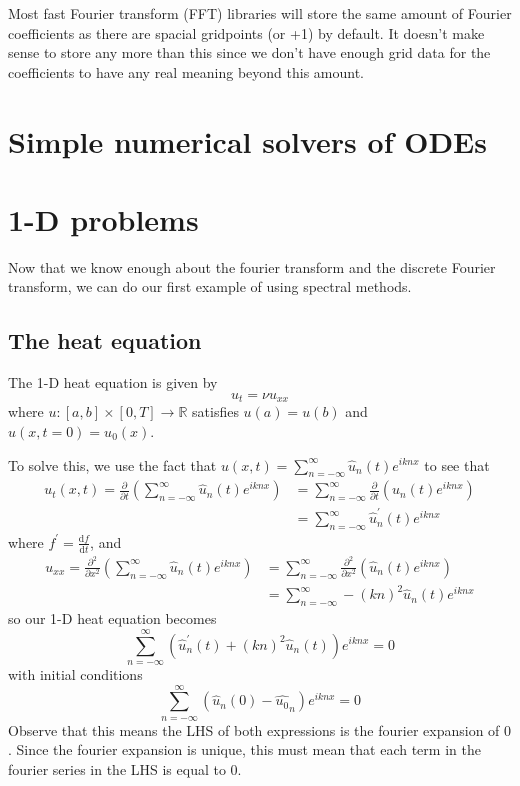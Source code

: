 \documentclass[a4paper,11pt]{article}
\theoremstyle{plain} %
\theoremstyle{remark}
\theoremstyle{definition} %
\renewcommand{\d}{\text{d}}
\newcommand{\R}{\mathbb{R}}
\begin{document}
Most fast Fourier transform (FFT) libraries will store the same amount of Fourier coefficients as there are spacial gridpoints (or +1) by default. It doesn't make sense to store any more than this since we don't have enough grid data for the coefficients to have any real meaning beyond this amount.

\section{Simple numerical solvers of ODEs}


\section{1-D problems}
Now that we know enough about the fourier transform and the discrete Fourier transform, we can do our first example of using spectral methods. 

\subsection{The heat equation}
The 1-D heat equation is given by
\[
u_t = \nu u_{xx}
\]
where $u:[a,b]\times[0,T]\rightarrow\R$ satisfies $u(a)=u(b)$ and $u(x,t=0)=u_0(x)$.

To solve this, we use the fact that $u(x,t)=\sum_{n=-\infty}^\infty \widehat{u}_n(t)e^{ikn x}$ to see that 
\begin{align*}
u_t(x,t)=\frac{\partial}{\partial t}\left(\sum_{n=-\infty}^\infty \widehat{u}_n(t)e^{ikn x}\right) &= \sum_{n=-\infty}^\infty \frac{\partial}{\partial t}\left(\widehat{u}_n(t)e^{ikn x}\right) \\
&=\sum_{n=-\infty}^\infty \widehat{u}^\prime_n(t)e^{ikn x}
\end{align*}
where $f^\prime=\frac{\d f}{\d t}$, and 
\begin{align*}
u_{xx} = \frac{\partial^2}{\partial x^2}\left(\sum_{n=-\infty}^\infty \widehat{u}_n(t)e^{ikn x}\right) &= \sum_{n=-\infty}^\infty \frac{\partial^2}{\partial x^2}\left(\widehat{u}_n(t)e^{ikn x}\right) \\
&= \sum_{n=-\infty}^\infty -(kn)^2\widehat{u}_n(t)e^{ikn x}
\end{align*}
so our 1-D heat equation becomes
\[
\sum_{n=-\infty}^\infty \left(\widehat{u}^\prime_n(t) +(kn)^2\widehat{u}_n(t)\right)e^{ikn x}=0
\]
with initial conditions
\[
\sum_{n=-\infty}^\infty \left(\widehat{u}_n(0)-\widehat{u_0}_n\right)e^{ikn x}=0
\]
Observe that this means the LHS of both expressions is the fourier expansion of $0$. Since the fourier expansion is unique, this must mean that each term in the fourier series in the LHS is equal to 0.
\end{document}
